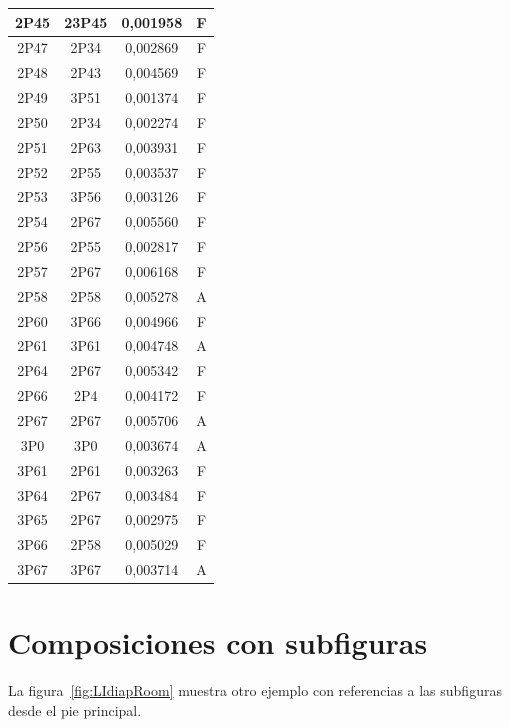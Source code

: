 \begin{center}
\begin{longtable}{|c|c|c|c|}
    \hline	2P45	&	23P45	&	0,001958	&	F	\\
    \hline	2P47	&	2P34	&	0,002869	&	F	\\
    \hline	2P48	&	2P43	&	0,004569	&	F	\\
    \hline	2P49	&	3P51	&	0,001374	&	F	\\
    \hline	2P50	&	2P34	&	0,002274	&	F	\\
    \hline	2P51	&	2P63	&	0,003931	&	F	\\
    \hline	2P52	&	2P55	&	0,003537	&	F	\\
    \hline	2P53	&	3P56	&	0,003126	&	F	\\
    \hline	2P54	&	2P67	&	0,005560	&	F	\\
    \hline	2P56	&	2P55	&	0,002817	&	F	\\
    \hline	2P57	&	2P67	&	0,006168	&	F	\\
    \hline	2P58	&	2P58	&	0,005278	&	A	\\
    \hline	2P60	&	3P66	&	0,004966	&	F	\\
    \hline	2P61	&	3P61	&	0,004748	&	A	\\
    \hline	2P64	&	2P67	&	0,005342	&	F	\\
    \hline	2P66	&	2P4	&	0,004172	&	F	\\
    \hline	2P67	&	2P67	&	0,005706	&	A	\\
    \hline	3P0	&	3P0	&	0,003674	&	A	\\
    \hline	3P61	&	2P61	&	0,003263	&	F	\\
    \hline	3P64	&	2P67	&	0,003484	&	F	\\
    \hline	3P65	&	2P67	&	0,002975	&	F	\\
    \hline	3P66	&	2P58	&	0,005029	&	F	\\
    \hline	3P67	&	3P67	&	0,003714	&	A	\\
	\end{longtable}
\end{center}

\section{Composiciones con subfiguras}
\label{sec:composiciones-subfiguras}

La figura~\ref{fig:LIdiapRoom} muestra otro ejemplo con referencias a las subfiguras desde el pie principal.

